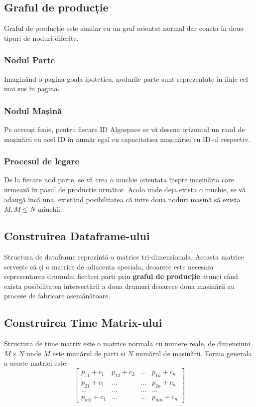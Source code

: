 \documentclass[12pt, twoside]{article}
\begin{document}
\subsection{Graful de producție}
Graful de producție este similar cu un graf orientat normal
dar consta în doua tipuri de noduri diferite.
\subsubsection{Nodul Parte}
Imaginând o pagina goala ipotetica, nodurile parte sunt
reprezentate în linie cel mai sus în pagina.
\subsubsection{Nodul Mașină}
Pe aceeași foaie, pentru fiecare ID Algospace se vă desena
orizontal un rand de mașinării cu acel ID în număr egal cu
capacitatiea mașinăriei cu ID-ul respectiv.
\subsubsection{Procesul de legare}
De la fiecare nod parte, se vă crea o muchie orientata
înspre mașinăria care urmează în pasul de producție următor.
Acolo unde deja exista o muchie, se vă adaugă încă una, existând
posibilitatea că intre doua noduri mașină să exista $M, M \le N$
miuchii.

\subsection{Construirea Dataframe-ului}
Structura de dataframe reprezintă o matrice tri-dimensionala.
Aceasta matrice servește că și o matrice de adiacenta speciala,
deoarece este necesara reprezentarea drumului fiecărei parti 
prin \textbf{graful de producție} atunci când exista posibilitatea
intersectării a doua drumuri deoarece doua mașinării au procese
de fabricare asemănătoare.

\subsection{Construirea Time Matrix-ului}
Structura de time matrix este o matrice normala cu numere reale,
de dimensiuni $M \times N$ unde $M$ este numărul de parti și $N$
numărul de mașinării. Forma generala a aceste matrici este:
\[
\begin{bmatrix}
  p_{11}+c_1 & p_{12}+c_2 &    ... &  p_{1n}+c_n \\
  p_{21}+c_1 &    ...   &    ...   &  p_{2n}+c_n \\
  ...      &    ...   &    ...   &     ... \\
  p_{m1}+c_1     &     ...   & ...   &      p_{mn}+c_n
\end{bmatrix}
\]
\end{document}
